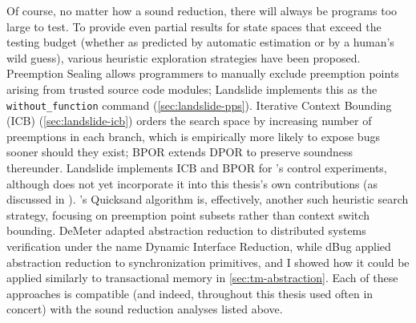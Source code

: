 Of course, no matter how  a sound reduction, there will always be programs too large to test.
To provide even partial results for state spaces that exceed the testing budget
(whether as predicted by automatic estimation \cite{estimation} or by a human's wild guess),
various heuristic exploration strategies have been proposed.
Preemption Sealing \cite{sealing} allows programmers to manually exclude preemption points
arising from trusted source code modules;
Landslide implements this as the {\tt without\_function} command (\cref{sec:landslide-pps}).
Iterative Context Bounding (ICB) \cite{chess-icb} (\cref{sec:landslide-icb})
orders the search space by increasing number of preemptions in each branch,
which is empirically more likely to expose bugs sooner should they exist;
BPOR \cite{bpor} extends DPOR to preserve soundness
thereunder. %
Landslide implements ICB and BPOR for 's control experiments,
although does not yet incorporate it into this thesis's own contributions
(as discussed in ).
's Quicksand algorithm is, effectively, another such heuristic search strategy,
focusing on preemption point subsets rather than context switch bounding.
DeMeter \cite{demeter} adapted abstraction reduction to distributed systems verification under the name Dynamic Interface Reduction,
while dBug \cite{dbug-phdthesis} applied abstraction reduction to synchronization primitives,
and I showed how it could be applied similarly to transactional memory in \cref{sec:tm-abstraction}.
Each of these approaches is compatible (and indeed, throughout this thesis used often in concert)
with the sound reduction analyses listed above.




